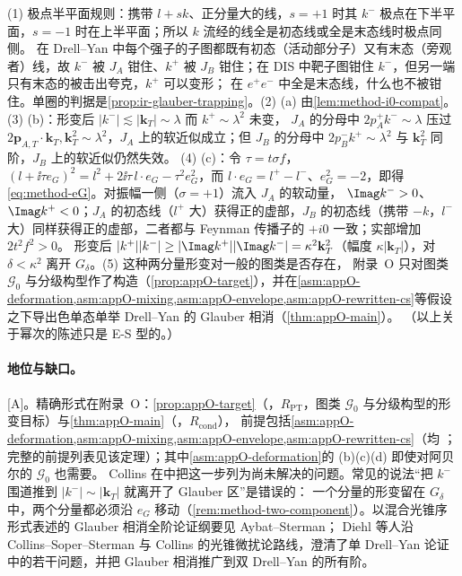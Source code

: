 \begin{proofsketch}
(1) 极点半平面规则：携带 $l+sk$、正分量大的线，$s=+1$ 时其 $k^-$ 极点在下半平面，$s=-1$ 时在上半平面；所以 $k$ 流经的线全是初态线或全是末态线时极点同侧。
在 Drell--Yan 中每个强子的子图都既有初态（活动部分子）又有末态（旁观者）线，故 $k^-$ 被 $J_A$ 钳住、$k^+$ 被 $J_B$ 钳住；在 DIS 中靶子图钳住 $k^-$，但另一端只有末态的被击出夸克，$k^+$ 可以变形；
在 $e^+e^-$ 中全是末态线，什么也不被钳住。单圈的判据是\cref{prop:ir-glauber-trapping}。(2) (a) 由\cref{lem:method-i0-compat}。(3) (b)：形变后 $|k^-|\lesssim|\mathbf k_T|\sim\lambda$ 而 $k^+\sim\lambda^2$ 未变，
$J_A$ 的分母中 $2p_A^+k^-\sim\lambda$ 压过 $2\mathbf p_{A,T}\cdot\mathbf k_T,\mathbf k_T^2\sim\lambda^2$，$J_A$ 上的软近似成立；但 $J_B$ 的分母中 $2p_B^-k^+\sim\lambda^2$ 与 $\mathbf k_T^2$ 同阶，$J_B$ 上的软近似仍然失效。
(4) (c)：令 $\tau=t\sigma f$，$(l+\ii\tau e_G)^2=l^2+2\ii\tau\,l\cdot e_G-\tau^2e_G^2$，而 $l\cdot e_G=l^+-l^-$、$e_G^2=-2$，即得\cref{eq:method-eG}。对振幅一侧（$\sigma=+1$）流入 $J_A$ 的软动量，
$\Imag k^->0$、$\Imag k^+<0$；$J_A$ 的初态线（$l^+$ 大）获得正的虚部，$J_B$ 的初态线（携带 $-k$，$l^-$ 大）同样获得正的虚部，二者都与 Feynman 传播子的 $+i0$ 一致；实部增加 $2t^2f^2>0$。
形变后 $|k^+||k^-|\ge|\Imag k^+||\Imag k^-|=\kappa^2\mathbf k_T^2$（幅度 $\kappa|\mathbf k_T|$），对 $\delta<\kappa^2$ 离开 $G_\delta$。(5) 这种两分量形变对一般的图类是否存在，
附录~O 只对图类 $\mathcal G_0$ 与分级构型作了构造（\cref{prop:appO-target}），并在\cref{asm:appO-deformation,asm:appO-mixing,asm:appO-envelope,asm:appO-rewritten-cs}等假设之下导出色单态单举 Drell--Yan 的 Glauber 相消（\cref{thm:appO-main}）。
（以上关于幂次的陈述只是 E-S 型的。）
\end{proofsketch}

\paragraph{地位与缺口。}[A]。精确形式在附录~O：\cref{prop:appO-target}（\tagR，$R_{\mathrm{PT}}$，图类 $\mathcal G_0$ 与分级构型的形变目标）与\cref{thm:appO-main}（\tagR，$R_{\mathrm{cond}}$），
前提包括\cref{asm:appO-deformation,asm:appO-mixing,asm:appO-envelope,asm:appO-rewritten-cs}（均 \tagA；完整的前提列表见该定理）；其中\cref{asm:appO-deformation}的 (b)(c)(d) 即使对阿贝尔的 $\mathcal G_0$ 也需要。
Collins 在\cite[第~14.4.8~节]{Collins2011}中把这一步列为尚未解决的问题。常见的说法“把 $k^-$ 围道推到 $|k^-|\sim|\mathbf k_T|$ 就离开了 Glauber 区”是错误的：
一个分量的形变留在 $G_\delta$ 中，两个分量都必须沿 $e_G$ 移动（\cref{rem:method-two-component}）。以混合光锥序形式表述的 Glauber 相消全阶论证纲要见 Aybat--Sterman\cite{AybatSterman2009}；
Diehl 等人\cite{Diehl:2015bca}沿 Collins--Soper--Sterman 与 Collins 的光锥微扰论路线，澄清了单 Drell--Yan 论证中的若干问题，并把 Glauber 相消推广到双 Drell--Yan 的所有阶。

